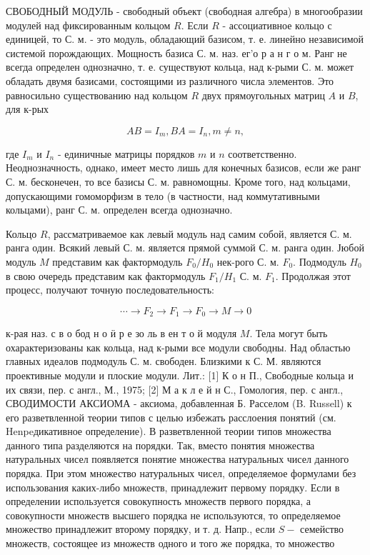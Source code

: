 \documentclass[10pt]{article}
\begin{document}
СВОБОДНЫЙ МОДУЛЬ - свободный объект (свободная алгебра) в многообразии модулей над фиксированным кольцом $R$. Если $R$ - ассоциативное кольцо с единицей, то С. м. - это модуль, обладающий базисом, т. е. линейно независимой системой порождающих. Мощность базиса С. м. наз. ег'о р а н г о м. Ранг не всегда определен однозначно, т. е. существуют кольца, над к-рыми С. м. может обладать двумя базисами, состоящими из различного числа элементов. Это равносильно существованию над кольцом $R$ двух прямоугольных матриц $A$ и $B$, для к-рых



\[

A B=I_{m}, B A=I_{n}, m \neq n,

\]



где $I_{m}$ и $I_{n}$ - единичные матрицы порядков $m$ и $n$ соответственно. Неоднозначность, однако, имеет место лишь для конечных базисов, если же ранг С. м. бесконечен, то все базисы С. м. равномощны. Кроме того, над кольцами, допускающими гомоморфизм в тело (в частности, над коммутативными кольцами), ранг С. м. определен всегда однозначно.



Кольцо $R$, рассматриваемое как левый модуль над самим собой, является С. м. ранга один. Всякий левый С. м. является прямой суммой С. м. ранга один. Јюбой модуль $M$ представим как фактормодуль $F_{0} / H_{0}$ нек-рого С. м. $F_{0}$. Подмодуль $H_{0}$ в свою очередь представим как фактормодуль $F_{1} / H_{1}$ С. м. $F_{1}$. Продолжая этот процесс, получают точную последовательность:



\[

\cdots \rightarrow F_{2} \rightarrow F_{1} \rightarrow F_{0} \rightarrow M \rightarrow 0

\]



к-рая наз. с в о бод н о ӥ р е зо ль в ен т о й модуля $M$. Тела могут быть охарактеризованы как кольца, над к-рыми все модули свободны. Над областью главных идеалов подмодуль С. м. свободен. Близкими к С. М. являются проективные модули и плоские модули. Лит.: [1] К о н П., Свободные кольца и их связи, пер. с англ., М., 1975; [2] М а к л е й н С., Гомология, пер. с англ., СВОДИМОСТИ АКСИОМА - аксиома, добавленная Б. Расселом (B. Russell) к его разветвленной теории типов с целью избежать расслоения понятий (см. Henpeдикативное определение). В разветвленной теории типов множества данного типа разделяются на порядки. Так, вместо понятия множества натуральных чисел появляется понятие множества натуральных чисел данного порядка. При этом множество натуральных чисел, определяемое формулами без использования каких-либо множеств, принадлежит первому порядку. Если в определении используется совокупность множеств первого порядка, а совокупности множеств высшего порядка не используются, то определяемое множество принадлежит второму порядку, и т. д. Напр., если $S-$ семейство множеств, состоящее из множеств одного и того же порядка, то множество
\end{document}
